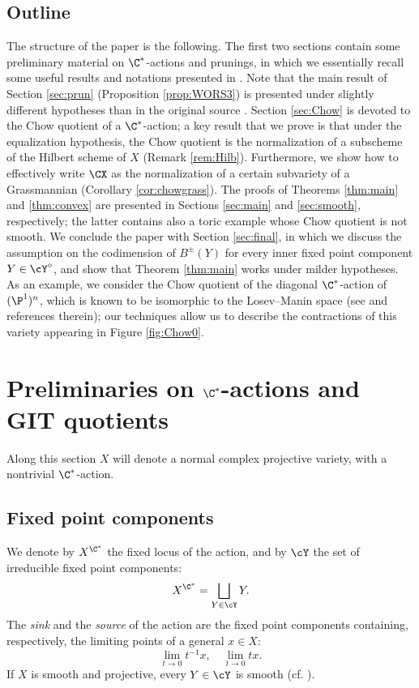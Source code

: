 \documentclass[reqno]{amsproc}
\theoremstyle{definition}
\begin{document}
\subsection*{Outline} The structure of the paper is the following. The first two sections contain some preliminary material on $\C^*$-actions and prunings, in which we essentially recall some useful results and notations presented in \cite{WORS3, BRUS}. Note that the main result of Section \ref{sec:prun} (Proposition \ref{prop:WORS3}) is presented under slightly different hypotheses than in the original source \cite{WORS3}. Section \ref{sec:Chow} is devoted to the Chow quotient of a $\C^*$-action; a key result that we prove is that under the equalization hypothesis, the Chow quotient is the normalization of a subscheme of the Hilbert scheme of $X$ (Remark \ref{rem:Hilb}). Furthermore, we show how to effectively write $\CX$ as the normalization of a certain subvariety of a Grassmannian (Corollary \ref{cor:chowgrass}). The proofs of Theorems \ref{thm:main} and \ref{thm:convex} are presented in Sections \ref{sec:main} and \ref{sec:smooth}, respectively; the latter contains also a toric example whose Chow quotient is not smooth. We conclude the paper with Section \ref{sec:final}, in which we discuss the assumption on the codimension of $B^\pm(Y)$ for every inner fixed point component $Y\in\cY^\circ$, and show that Theorem \ref{thm:main} works under milder hypotheses. As an example, we consider the Chow quotient of the diagonal $\C^*$-action of $(\P^1)^n$, which is known to be isomorphic to the Losev--Manin space (see \cite{DRS} and references therein); our techniques allow us to describe the contractions of this variety appearing in Figure \ref{fig:Chow0}.




\section{Preliminaries on $\C^*$-actions and GIT quotients}\label{sec:prelim}


Along this section $X$ will denote a normal complex projective variety, with a nontrivial $\C^*$-action. 


\subsection{Fixed point components}\label{sssec:fxd} We denote by $X^{\C^*}$  the fixed locus of the action, and by $\cY$ the set of irreducible fixed point components: 
$$X^{\C^*}=\bigsqcup_{Y\in \cY}Y.$$ 
 The {\em sink} and the {\em source} of the action are the fixed point components containing, respectively, the limiting points of  a general $x \in X$:
$$
\lim_{t\to 0}t^{-1}x, \quad \lim_{t\to 0}tx.
$$
 If $X$ is smooth and projective, every $Y\in\cY$ is smooth (cf. \cite{IVERSEN}).
\end{document}
